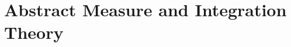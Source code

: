 \documentclass[../../main.tex]{subfiles}
\begin{document}
\chapter{Abstract Measure and Integration Theory}
\end{document}
